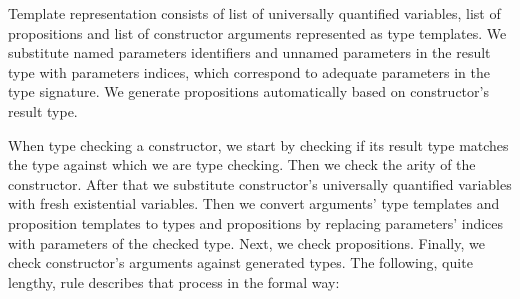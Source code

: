 \documentclass[declaration,shortabstract,english]{iithesis}
\begin{document}
Template representation consists of list of universally quantified variables, list of propositions and list of constructor
arguments represented as type templates. We substitute named parameters identifiers and unnamed parameters in the result type with
parameters indices, which correspond to adequate parameters in the type signature.
We generate propositions automatically based on constructor's result type.

When type checking a constructor, we start by checking if its result type matches the type against which we are type checking.
Then we check the arity of the constructor.
After that we substitute constructor's universally quantified variables with fresh existential variables.
Then we convert arguments' type templates and proposition templates to types and propositions
by replacing parameters' indices with parameters of the checked type.
Next, we check propositions. Finally, we check constructor's arguments against generated types.
The following, quite lengthy, rule describes that process in the formal way:
\end{document}

